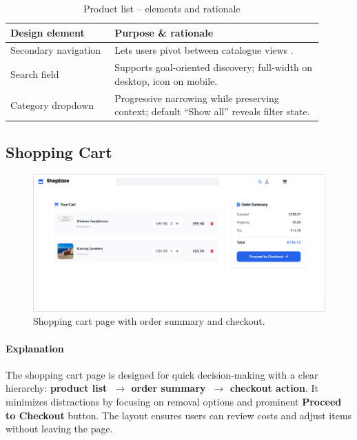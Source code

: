 \documentclass[12pt]{article}
\begin{document}
	\begin{table}[H]
		\centering
		\caption{Product list – elements and rationale}
		\label{tab:product-elements}
		\begin{tabular}{p{0.30\linewidth} p{0.60\linewidth}}
			\toprule
			\textbf{Design element} & \textbf{Purpose \& rationale} \\ \midrule
			Secondary navigation    & Lets users pivot between catalogue views .\\
			Search field            & Supports goal-oriented discovery; full-width on desktop, icon on mobile.\\
			Category dropdown       & Progressive narrowing while preserving context; default “Show all” reveals filter state.\\

	
			\bottomrule
		\end{tabular}
	\end{table}


	\subsection{Shopping Cart}\label{subsec:shopping-cart}

	\begin{figure}[H]
		\centering
		\includegraphics[width=\linewidth]{pictures/main/ShoppingCart_Figma}%
		\caption{Shopping cart page with order summary and checkout.}
		\label{fig:ui-cart}
	\end{figure}

	\paragraph{Explanation}%
	The shopping cart page is designed for quick decision-making with a clear hierarchy:
	\textbf{product list~$\rightarrow$ order summary~$\rightarrow$ checkout action}. It minimizes distractions
	by focusing on removal options and prominent \textbf{Proceed to Checkout} button.
	The layout ensures users can review costs and adjust items without leaving the page.
\end{document}
